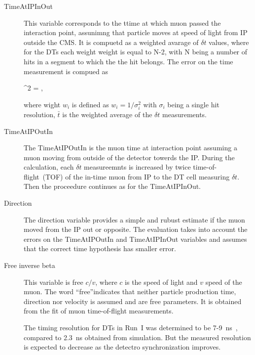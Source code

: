 \begin{description}
\item [TimeAtIPInOut]
This variable corresponds to the ttime at which muon passed the interaction point, assunimng that particle moves at speed of light from IP outside the CMS. It is compuetd as a weighted avarage of $\delta t$ values, where for the DTs each weight weight is equal to N-2, with N being a number of hits in a segment to which the the hit belongs. The error on the time measurement is compued as

{
 \sigma^{2} =  \times {} \times {},
}

where wight $w_{i}$ is defined as $w_i = 1/\sigma_{i}^2$ with $\sigma_{i}$ being a single hit resolution, $\bar{t}$ is the weighted average of the $\delta t$ measurements.

\item[TimeAtIPOutIn]
The TimeAtIPOutIn is the muon time at interaction point assuming a muon moving from outside of the detector towerds the IP. During the calculation, each $\delta t$ measureemnts is increased by twice time-of-flight~(TOF) of the in-time muon from IP to the DT cell measuring $\delta t$. Then the proceedure continues as for the TimeAtIPInOut.

\item[Direction]
The direction variable provides a simple and rubust estimate if the muon moved from the IP out or opposite. The evaluation takes into account the errors on the TimeAtIPOutIn and TimeAtIPInOut variables and assumes that the correct time hypothesis has smaller error.

\item[Free inverse beta]
This variable is free $c/v$, where $c$ is the speed of light and $v$ speed of the muon. The word ``free''indicates that neither particle production time, direction nor velocity is assumed and are free parameters. It is obtained from the fit of muon time-of-flight measurements.

The timing resolution for DTs in Run~I was determined to be 7-9~ns~\cite{Traczyk:1365029}, compared to 2.3~ns obtained from simulation. But the measured resolution is expected to decrease as the detectro synchronization improves.

\end{description}



